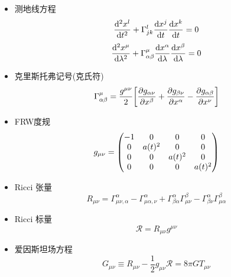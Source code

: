 \begin{itemize}
    \item 测地线方程
    \begin{equation}
        \dv[2]{x^l}{t} + \Gamma^l_{jk}\dv{x^j}{t}\dv{x^k}{t} = 0\label{geodesic}
    \end{equation}
    \begin{equation}
        \dv[2]{x^\mu}{\lambda} + \Gamma^\mu_{\alpha\beta}\dv{x^\alpha}{\lambda}\dv{x^\beta}{\lambda} = 0\label{4dgeodesic}
    \end{equation} 
    \item 克里斯托弗记号(克氏符) 
    \begin{equation}
        \Gamma^\mu_{\alpha\beta} = \frac{g^{\mu\nu}}{2}\qty[\pdv{g_{\alpha\nu}}{x^\beta} + \pdv{g_{\beta\nu}}{x^\alpha} - \pdv{g_{\alpha\beta}}{x^\nu}]\label{chris}
    \end{equation} 
    \item FRW度规
    \begin{equation}
        g_{\mu\nu} = \mqty(\dmat[0]{-1, a(t)^2, a(t)^2, a(t)^2}) \label{FRWmertic}
    \end{equation}
    \item Ricci 张量
    \begin{equation}
        R_{\mu\nu} = \Gamma^\alpha_{\mu\nu, \alpha} - \Gamma^\alpha_{\mu\alpha, \nu} + \Gamma^\alpha_{\beta\alpha}\Gamma^\beta_{\mu\nu} - \Gamma^\alpha_{\beta\nu}\Gamma^\beta_{\mu\alpha}\label{riccit}
    \end{equation} 
    \item Ricci 标量
    \begin{equation}
        \mathcal{R} = R_{\mu\nu}g^{\mu\nu}
    \end{equation}
    \item 爱因斯坦场方程
    \begin{equation}
        G_{\mu\nu}\equiv R_{\mu\nu} - \frac{1}{2}g_{\mu\nu}\mathcal{R} = 8\pi GT_{\mu\nu}\label{einsteineq}
    \end{equation}
\end{itemize}